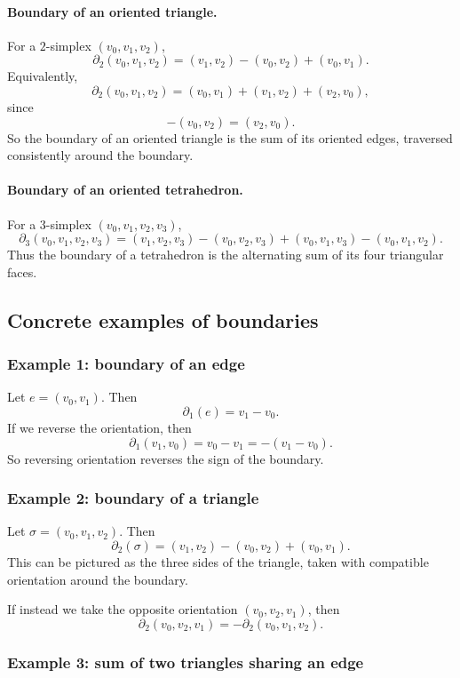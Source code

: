 \documentclass[12pt,a4paper]{article}
\theoremstyle{notespace}
\begin{document}
\paragraph{Boundary of an oriented triangle.}
For a \(2\)-simplex \((v_0,v_1,v_2)\),
\[
\partial_2(v_0,v_1,v_2)
=
(v_1,v_2)-(v_0,v_2)+(v_0,v_1).
\]
Equivalently,
\[
\partial_2(v_0,v_1,v_2)
=
(v_0,v_1)+(v_1,v_2)+(v_2,v_0),
\]
since
\[
-(v_0,v_2)=(v_2,v_0).
\]
So the boundary of an oriented triangle is the sum of its oriented edges, traversed consistently around the boundary.

\paragraph{Boundary of an oriented tetrahedron.}
For a \(3\)-simplex \((v_0,v_1,v_2,v_3)\),
\[
\partial_3(v_0,v_1,v_2,v_3)
=
(v_1,v_2,v_3)
-(v_0,v_2,v_3)
+(v_0,v_1,v_3)
-(v_0,v_1,v_2).
\]
Thus the boundary of a tetrahedron is the alternating sum of its four triangular faces.

\subsection{Concrete examples of boundaries}

\subsubsection*{Example 1: boundary of an edge}

Let \(e=(v_0,v_1)\). Then
\[
\partial_1(e)=v_1-v_0.
\]
If we reverse the orientation, then
\[
\partial_1(v_1,v_0)=v_0-v_1=-(v_1-v_0).
\]
So reversing orientation reverses the sign of the boundary.

\subsubsection*{Example 2: boundary of a triangle}

Let \(\sigma=(v_0,v_1,v_2)\). Then
\[
\partial_2(\sigma)
=
(v_1,v_2)-(v_0,v_2)+(v_0,v_1).
\]
This can be pictured as the three sides of the triangle, taken with compatible orientation around the boundary.

If instead we take the opposite orientation \((v_0,v_2,v_1)\), then
\[
\partial_2(v_0,v_2,v_1)=-\partial_2(v_0,v_1,v_2).
\]

\subsubsection*{Example 3: sum of two triangles sharing an edge}
\end{document}
